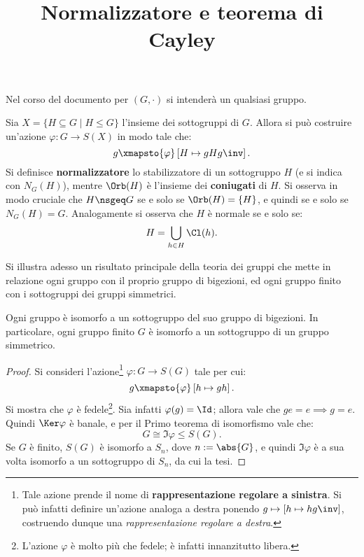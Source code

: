 \documentclass[12pt]{scrartcl}
\begin{document}
	\title{Normalizzatore e teorema di Cayley}
	\maketitle
	
	\begin{note}
		Nel corso del documento per $(G, \cdot)$ si intenderà un qualsiasi gruppo.
	\end{note}
	
	Sia $X = \{ H \subseteq G \mid H \leq G \}$ l'insieme dei sottogruppi di $G$.
	Allora si può costruire un'azione $\varphi : G \to S(X)$ in modo tale che:
	\[ g \xmapsto{\varphi} \left[ H \mapsto gHg\inv \right]. \]
	Si definisce \textbf{normalizzatore} lo stabilizzatore di un sottogruppo
	$H$ (e si indica con $N_G(H)$), mentre $\Orb(H)$ è l'insieme dei \textbf{coniugati}
	di $H$. Si osserva in modo cruciale che $H \nsgeq G$ se e solo se
	$\Orb(H) = \{H\}$, e quindi se e solo se $N_G(H) = G$. Analogamente si
	osserva che $H$ è normale se e solo se:
	\[ H = \bigcup_{h \in H} \Cl(h). \] \bigskip
	
	
	Si illustra adesso un risultato principale della teoria dei gruppi che mette in
	relazione ogni gruppo con il proprio gruppo di bigezioni, ed ogni gruppo finito con i
	sottogruppi dei gruppi simmetrici.
	
	\begin{theorem}[di Cayley]
		Ogni gruppo è isomorfo a un sottogruppo del suo gruppo di bigezioni.
		In particolare, ogni gruppo finito $G$ è isomorfo a un sottogruppo di un gruppo
		simmetrico.
	\end{theorem}
	
	\begin{proof}
		Si consideri l'azione\footnote{Tale azione prende il nome di \textbf{rappresentazione regolare a sinistra}.
		Si può infatti definire un'azione analoga a destra ponendo $g \mapsto \left[ h \mapsto hg\inv \right]$,
		costruendo dunque una \textit{rappresentazione regolare a destra}.} $\varphi : G \to S(G)$ tale per cui:
		\[ g \xmapsto{\varphi} \left[ h \mapsto gh \right]. \]
		Si mostra che $\varphi$ è fedele\footnote{L'azione $\varphi$ è molto
		più che fedele; è infatti innanzitutto libera.}. Sia infatti $\varphi(g) = \Id$; allora
		vale che $ge = e \implies g = e$. Quindi $\Ker \varphi$ è banale, e per il
		Primo teorema di isomorfismo vale che:
		\[ G \cong \Im \varphi \leq S(G). \]
		Se $G$ è finito, $S(G)$ è isomorfo a $S_n$, dove $n := \abs{G}$, e quindi
		$\Im \varphi$ è a sua volta isomorfo a un sottogruppo di $S_n$, da cui
		la tesi.
	\end{proof}
\end{document}
